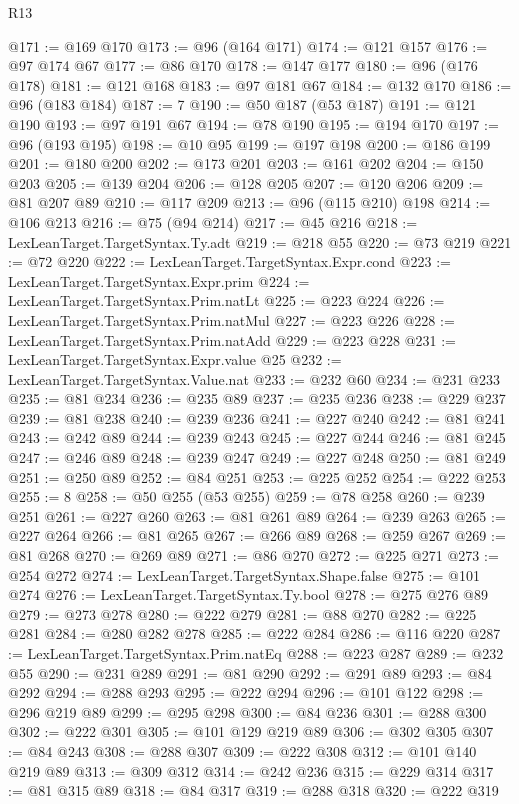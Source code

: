 \begin{lexlean}{R13}
\begin{coremodule}
@171 := @169 @170
@173 := @96 (@164 @171)
@174 := @121 @157
@176 := @97 @174 @67
@177 := @86 @170
@178 := @147 @177
@180 := @96 (@176 @178)
@181 := @121 @168
@183 := @97 @181 @67
@184 := @132 @170
@186 := @96 (@183 @184)
@187 := 7
@190 := @50 @187 (@53 @187)
@191 := @121 @190
@193 := @97 @191 @67
@194 := @78 @190
@195 := @194 @170
@197 := @96 (@193 @195)
@198 := @10 @95
@199 := @197 @198
@200 := @186 @199
@201 := @180 @200
@202 := @173 @201
@203 := @161 @202
@204 := @150 @203
@205 := @139 @204
@206 := @128 @205
@207 := @120 @206
@209 := @81 @207 @89
@210 := @117 @209
@213 := @96 (@115 @210) @198
@214 := @106 @213
@216 := @75 (@94 @214)
@217 := @45 @216
@218 := LexLeanTarget.TargetSyntax.Ty.adt
@219 := @218 @55
@220 := @73 @219
@221 := @72 @220
@222 := LexLeanTarget.TargetSyntax.Expr.cond
@223 := LexLeanTarget.TargetSyntax.Expr.prim
@224 := LexLeanTarget.TargetSyntax.Prim.natLt
@225 := @223 @224
@226 := LexLeanTarget.TargetSyntax.Prim.natMul
@227 := @223 @226
@228 := LexLeanTarget.TargetSyntax.Prim.natAdd
@229 := @223 @228
@231 := LexLeanTarget.TargetSyntax.Expr.value @25
@232 := LexLeanTarget.TargetSyntax.Value.nat
@233 := @232 @60
@234 := @231 @233
@235 := @81 @234
@236 := @235 @89
@237 := @235 @236
@238 := @229 @237
@239 := @81 @238
@240 := @239 @236
@241 := @227 @240
@242 := @81 @241
@243 := @242 @89
@244 := @239 @243
@245 := @227 @244
@246 := @81 @245
@247 := @246 @89
@248 := @239 @247
@249 := @227 @248
@250 := @81 @249
@251 := @250 @89
@252 := @84 @251
@253 := @225 @252
@254 := @222 @253
@255 := 8
@258 := @50 @255 (@53 @255)
@259 := @78 @258
@260 := @239 @251
@261 := @227 @260
@263 := @81 @261 @89
@264 := @239 @263
@265 := @227 @264
@266 := @81 @265
@267 := @266 @89
@268 := @259 @267
@269 := @81 @268
@270 := @269 @89
@271 := @86 @270
@272 := @225 @271
@273 := @254 @272
@274 := LexLeanTarget.TargetSyntax.Shape.false
@275 := @101 @274
@276 := LexLeanTarget.TargetSyntax.Ty.bool
@278 := @275 @276 @89
@279 := @273 @278
@280 := @222 @279
@281 := @88 @270
@282 := @225 @281
@284 := @280 @282 @278
@285 := @222 @284
@286 := @116 @220
@287 := LexLeanTarget.TargetSyntax.Prim.natEq
@288 := @223 @287
@289 := @232 @55
@290 := @231 @289
@291 := @81 @290
@292 := @291 @89
@293 := @84 @292
@294 := @288 @293
@295 := @222 @294
@296 := @101 @122
@298 := @296 @219 @89
@299 := @295 @298
@300 := @84 @236
@301 := @288 @300
@302 := @222 @301
@305 := @101 @129 @219 @89
@306 := @302 @305
@307 := @84 @243
@308 := @288 @307
@309 := @222 @308
@312 := @101 @140 @219 @89
@313 := @309 @312
@314 := @242 @236
@315 := @229 @314
@317 := @81 @315 @89
@318 := @84 @317
@319 := @288 @318
@320 := @222 @319

\end{coremodule}
\end{lexlean}
